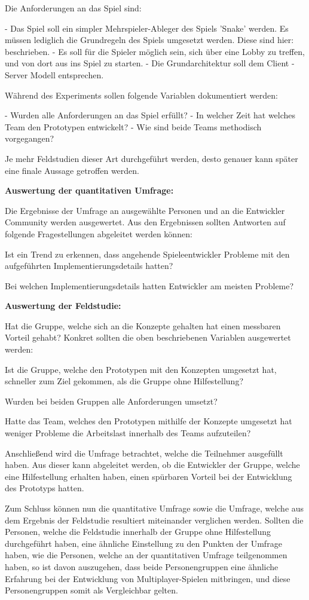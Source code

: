 Die Anforderungen an das Spiel sind:

- Das Spiel soll ein simpler Mehrspieler-Ableger des Spiels 'Snake' werden. Es müssen lediglich die Grundregeln des Spiels umgesetzt werden. Diese sind hier: \cite{.22.02.2022} beschrieben.
- Es soll für die Spieler möglich sein, sich über eine Lobby zu treffen, und von dort aus ins Spiel zu starten.
- Die Grundarchitektur soll dem Client - Server Modell entsprechen.

Während des Experiments sollen folgende Variablen dokumentiert werden:

- Wurden alle Anforderungen an das Spiel erfüllt?
- In welcher Zeit hat welches Team den Prototypen entwickelt?
- Wie sind beide Teams methodisch vorgegangen?

Je mehr Feldstudien dieser Art durchgeführt werden, desto genauer kann später eine finale Aussage getroffen werden.

\textbf{Auswertung der quantitativen Umfrage:}

Die Ergebnisse der Umfrage an ausgewählte Personen und an die Entwickler Community werden ausgewertet. Aus den Ergebnissen sollten Antworten auf folgende Fragestellungen abgeleitet werden können:

Ist ein Trend zu erkennen, dass angehende Spieleentwickler Probleme mit den aufgeführten Implementierungsdetails hatten?

Bei welchen Implementierungsdetails hatten Entwickler am meisten Probleme?

\textbf{Auswertung der Feldstudie:}

Hat die Gruppe, welche sich an die Konzepte gehalten hat einen messbaren Vorteil gehabt? Konkret sollten die oben beschriebenen Variablen ausgewertet werden:

Ist die Gruppe, welche den Prototypen mit den Konzepten umgesetzt hat, schneller zum Ziel gekommen, als die Gruppe ohne Hilfestellung?

Wurden bei beiden Gruppen alle Anforderungen umsetzt?

Hatte das Team, welches den Prototypen mithilfe der Konzepte umgesetzt hat weniger Probleme die Arbeitslast innerhalb des Teams aufzuteilen?

Anschließend wird die Umfrage betrachtet, welche die Teilnehmer ausgefüllt haben. Aus dieser kann abgeleitet werden, ob die Entwickler der Gruppe, welche eine Hilfestellung erhalten haben, einen spürbaren Vorteil bei der Entwicklung des Prototyps hatten.

Zum Schluss können nun die quantitative Umfrage sowie die Umfrage, welche aus dem Ergebnis der Feldstudie resultiert miteinander verglichen werden. Sollten die Personen, welche die Feldstudie innerhalb der Gruppe ohne Hilfestellung durchgeführt haben, eine ähnliche Einstellung zu den Punkten der Umfrage haben, wie die Personen, welche an der quantitativen Umfrage teilgenommen haben, so ist davon auszugehen, dass beide Personengruppen eine ähnliche Erfahrung bei der Entwicklung von Multiplayer-Spielen mitbringen, und diese Personengruppen somit als Vergleichbar gelten.

